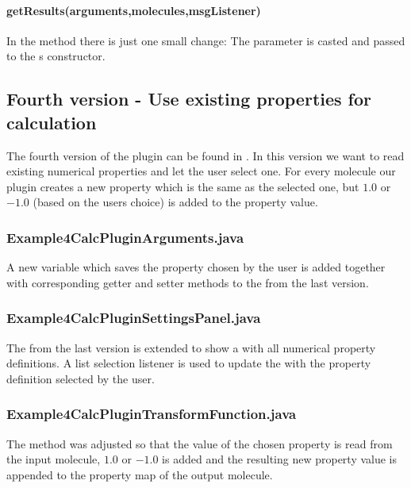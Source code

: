       \paragraph{getResults(arguments,molecules,msgListener)}
      In the  method there is just one small change:
      The  parameter is casted and passed
      to the s constructor.

\subsection{Fourth version - Use existing properties for calculation}
The fourth version of the plugin can be found in
.
In this version we want to read existing numerical properties and let the user select one.
For every molecule our plugin creates a new property which is the
same as the selected one, but $1.0$ or $-1.0$ (based on the users choice) is added to the property value.

  \subsubsection{Example4CalcPluginArguments.java}
  A new variable which saves the property chosen by the user is added together
  with corresponding getter and setter methods
  to the  from the last version.

  \subsubsection{Example4CalcPluginSettingsPanel.java}
  The  from the last version is extended to show a
   with all numerical property definitions.
  A list selection listener is used to update the 
  with the property definition selected by the user.

  \subsubsection{Example4CalcPluginTransformFunction.java}
  The  method was adjusted so that the value of
  the chosen property is read from the input molecule,
  $1.0$ or $-1.0$ is added and the resulting new property value
  is appended to the property map of the output molecule.

